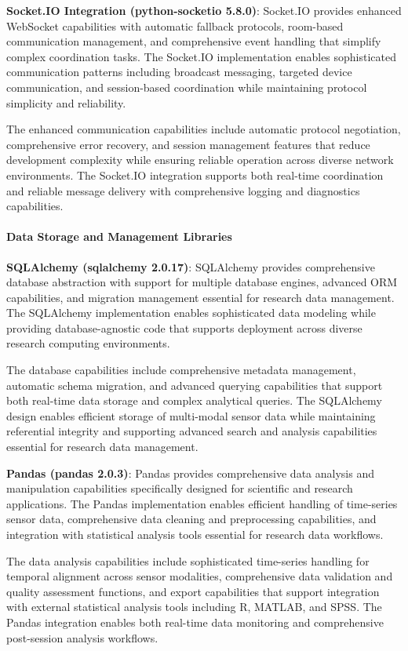 \documentclass[11pt,a4paper]{article}
\begin{document}
\textbf{Socket.IO Integration (python-socketio 5.8.0)}: Socket.IO provides enhanced WebSocket capabilities with automatic
fallback protocols, room-based communication management, and comprehensive event handling that simplify complex
coordination tasks. The Socket.IO implementation enables sophisticated communication patterns including broadcast
messaging, targeted device communication, and session-based coordination while maintaining protocol simplicity and
reliability.

The enhanced communication capabilities include automatic protocol negotiation, comprehensive error recovery, and
session management features that reduce development complexity while ensuring reliable operation across diverse network
environments. The Socket.IO integration supports both real-time coordination and reliable message delivery with
comprehensive logging and diagnostics capabilities.

\paragraph{Data Storage and Management Libraries}

\textbf{SQLAlchemy (sqlalchemy 2.0.17)}: SQLAlchemy provides comprehensive database abstraction with support for multiple
database engines, advanced ORM capabilities, and migration management essential for research data management. The
SQLAlchemy implementation enables sophisticated data modeling while providing database-agnostic code that supports
deployment across diverse research computing environments.

The database capabilities include comprehensive metadata management, automatic schema migration, and advanced querying
capabilities that support both real-time data storage and complex analytical queries. The SQLAlchemy design enables
efficient storage of multi-modal sensor data while maintaining referential integrity and supporting advanced search and
analysis capabilities essential for research data management.

\textbf{Pandas (pandas 2.0.3)}: Pandas provides comprehensive data analysis and manipulation capabilities specifically
designed for scientific and research applications. The Pandas implementation enables efficient handling of time-series
sensor data, comprehensive data cleaning and preprocessing capabilities, and integration with statistical analysis tools
essential for research data workflows.

The data analysis capabilities include sophisticated time-series handling for temporal alignment across sensor
modalities, comprehensive data validation and quality assessment functions, and export capabilities that support
integration with external statistical analysis tools including R, MATLAB, and SPSS. The Pandas integration enables both
real-time data monitoring and comprehensive post-session analysis workflows.
\end{document}
